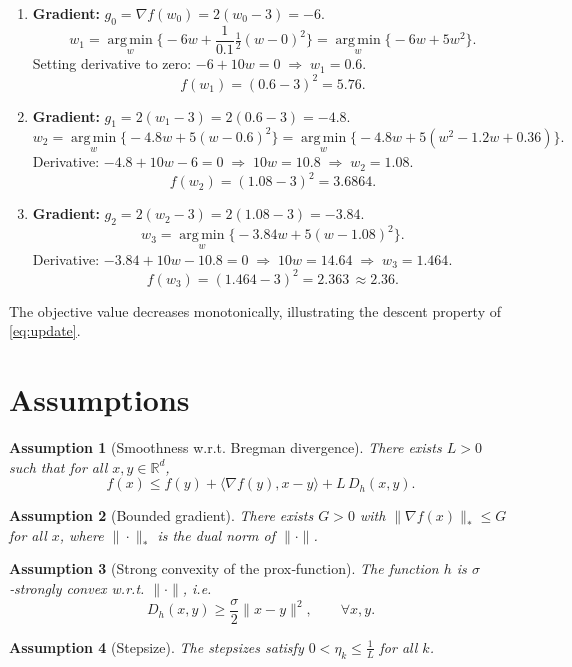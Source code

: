 \documentclass{article}
\newtheorem{assumption}{Assumption}
\newcommand{\argmin}{\operatorname*{arg\,min}}
\newcommand{\grad}{\nabla}
\newcommand{\D}{D_h}
\begin{document}
\begin{enumerate}[label=Iter \arabic*:, leftmargin=*]
\item \textbf{Gradient:} $g_0=\grad f(w_0)=2(w_0-3)=-6$.
\[
w_{1}= \argmin_{w}\Big\{-6w+\frac{1}{0.1}\tfrac12 (w-0)^{2}\Big\}
      =\argmin_{w}\Big\{-6w+5w^{2}\Big\}.
\]
Setting derivative to zero: $-6+10w=0\;\Rightarrow\;w_{1}=0.6$.
\[
f(w_{1})=(0.6-3)^{2}=5.76.
\]

\item \textbf{Gradient:} $g_1=2(w_{1}-3)=2(0.6-3)=-4.8$.
\[
w_{2}= \argmin_{w}\Big\{-4.8 w+5 (w-0.6)^{2}\Big\}
      =\argmin_{w}\Big\{-4.8 w+5(w^{2}-1.2w+0.36)\Big\}.
\]
Derivative: $-4.8+10w-6=0\;\Rightarrow\;10w=10.8\;\Rightarrow\;w_{2}=1.08$.
\[
f(w_{2})=(1.08-3)^{2}=3.6864.
\]

\item \textbf{Gradient:} $g_2=2(w_{2}-3)=2(1.08-3)=-3.84$.
\[
w_{3}= \argmin_{w}\Big\{-3.84 w+5 (w-1.08)^{2}\Big\}.
\]
Derivative: $-3.84+10w-10.8=0\;\Rightarrow\;10w=14.64\;\Rightarrow\;w_{3}=1.464$.
\[
f(w_{3})=(1.464-3)^{2}=2.363\,\approx2.36.
\]
\end{enumerate}
The objective value decreases monotonically, illustrating the descent property of \eqref{eq:update}.

\newpage
\section*{Assumptions}
\begin{assumption}[Smoothness w.r.t. Bregman divergence]\label{as:smooth}
There exists $L>0$ such that for all $x,y\in\mathbb{R}^{d}$,
\[
f(x)\le f(y)+\langle \grad f(y),x-y\rangle+L\,\D(x,y).
\]
\end{assumption}

\begin{assumption}[Bounded gradient]\label{as:bound}
There exists $G>0$ with $\|\grad f(x)\|_{*}\le G$ for all $x$, where $\|\cdot\|_{*}$ is the dual norm of $\|\cdot\|$.
\end{assumption}

\begin{assumption}[Strong convexity of the prox‑function]\label{as:strong}
The function $h$ is $\sigma$‑strongly convex w.r.t. $\|\cdot\|$, i.e.
\[
\D(x,y)\ge\frac{\sigma}{2}\|x-y\|^{2},\qquad\forall x,y.
\]
\end{assumption}

\begin{assumption}[Stepsize]\label{as:stepsize}
The stepsizes satisfy $0<\eta_k\le \frac{1}{L}$ for all $k$.
\end{assumption}
\end{document}
